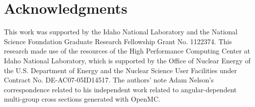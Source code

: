 \section*{Acknowledgments}


This work was supported by the Idaho National Laboratory and the National Science Foundation Graduate Research Fellowship Grant No. 1122374. This research made use of the resources of the High Performance Computing Center at Idaho National Laboratory, which is supported by the Office of Nuclear Energy of the U.S. Department of Energy and the Nuclear Science User Facilities under Contract No. DE-AC07-05ID14517. The authors' note Adam Nelson's correspondence related to his independent work related to angular-dependent multi-group cross sections generated with OpenMC.